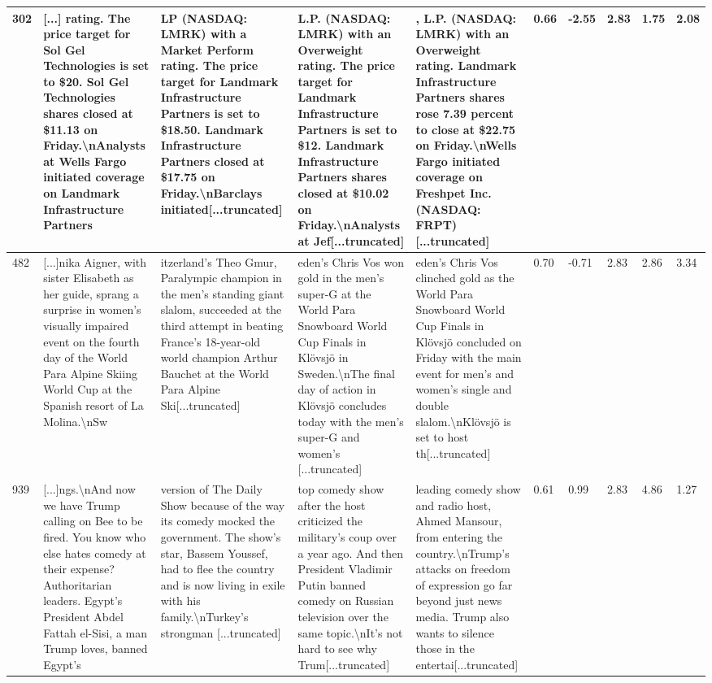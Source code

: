 \documentclass{article}
\theoremstyle{plain}
\theoremstyle{definition}
\theoremstyle{remark}
\begin{document}
\begin{table}[t]
\begin{tabular}{p{0.2cm}|p{2.75cm}|p{2.75cm}|p{2.75cm}|p{2.75cm}|p{0.2cm}|p{0.42cm}|p{0.42cm}|p{0.3cm}|p{0.3cm}}
 302 &  [...] rating. The price target for Sol Gel Technologies is set to \$20. Sol Gel Technologies shares closed at \$11.13 on Friday.\textbackslash nAnalysts at Wells Fargo initiated coverage on Landmark Infrastructure Partners &   LP (NASDAQ: LMRK) with a Market Perform rating. The price target for Landmark Infrastructure Partners is set to \$18.50. Landmark Infrastructure Partners closed at \$17.75 on Friday.\textbackslash nBarclays initiated[...truncated] &   L.P. (NASDAQ: LMRK) with an Overweight rating. The price target for Landmark Infrastructure Partners is set to \$12. Landmark Infrastructure Partners shares closed at \$10.02 on Friday.\textbackslash nAnalysts at Jef[...truncated] &  , L.P. (NASDAQ: LMRK) with an Overweight rating. Landmark Infrastructure Partners shares rose 7.39 percent to close at \$22.75 on Friday.\textbackslash nWells Fargo initiated coverage on Freshpet Inc. (NASDAQ: FRPT) [...truncated] &               0.66 &          -2.55 &          2.83 &       1.75 &      2.08 \\\midrule
 482 &  [...]nika Aigner, with sister Elisabeth as her guide, sprang a surprise in women’s visually impaired event on the fourth day of the World Para Alpine Skiing World Cup at the Spanish resort of La Molina.\textbackslash nSw &   itzerland's Theo Gmur, Paralympic champion in the men's standing giant slalom, succeeded at the third attempt in beating France's 18-year-old world champion Arthur Bauchet at the World Para Alpine Ski[...truncated] &  eden’s Chris Vos won gold in the men’s super-G at the World Para Snowboard World Cup Finals in Klövsjö in Sweden.\textbackslash nThe final day of action in Klövsjö concludes today with the men’s super-G and women’s [...truncated] &  eden’s Chris Vos clinched gold as the World Para Snowboard World Cup Finals in Klövsjö concluded on Friday with the main event for men’s and women’s single and double slalom.\textbackslash nKlövsjö is set to host th[...truncated] &               0.70 &          -0.71 &          2.83 &       2.86 &      3.34 \\\midrule
 939 &  [...]ngs.\textbackslash nAnd now we have Trump calling on Bee to be fired. You know who else hates comedy at their expense? Authoritarian leaders. Egypt’s President Abdel Fattah el-Sisi, a man Trump loves, banned Egypt’s &   version of The Daily Show because of the way its comedy mocked the government. The show’s star, Bassem Youssef, had to flee the country and is now living in exile with his family.\textbackslash nTurkey’s strongman [...truncated] &   top comedy show after the host criticized the military’s coup over a year ago. And then President Vladimir Putin banned comedy on Russian television over the same topic.\textbackslash nIt’s not hard to see why Trum[...truncated] &   leading comedy show and radio host, Ahmed Mansour, from entering the country.\textbackslash nTrump’s attacks on freedom of expression go far beyond just news media. Trump also wants to silence those in the entertai[...truncated] &               0.61 &           0.99 &          2.83 &       4.86 &      1.27 \\

\end{tabular}
\end{table}
\end{document}

